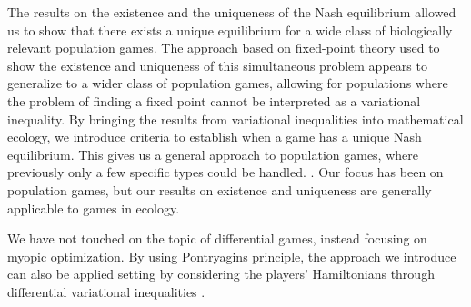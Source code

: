 The results on the existence and the uniqueness of the Nash equilibrium allowed us to show that there exists a unique equilibrium for a wide class of biologically relevant population games. The approach based on fixed-point theory used to show the existence and uniqueness of this simultaneous problem appears to generalize to a wider class of population games, allowing for populations where the problem of finding a fixed point cannot be interpreted as a variational inequality. By bringing the results from variational inequalities into mathematical ecology, we introduce criteria to establish when a game has a unique Nash equilibrium. This gives us a general approach to population games, where previously only a few specific types could be handled. \citep{sandholm2010population}. Our focus has been on population games, but our results on existence and uniqueness are generally applicable to games in ecology.


We have not touched on the topic of differential games, instead focusing on myopic optimization. By using Pontryagins principle, the approach we introduce can also be applied setting by considering the players' Hamiltonians through differential variational inequalities \citep{pang2008differential}.










